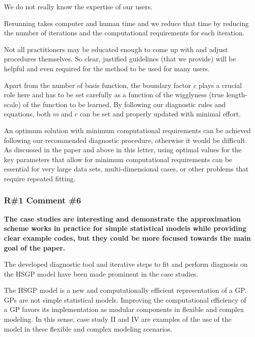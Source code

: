 \documentclass[11pt]{report}
\begin{document}
We do not really know the expertise of our users. 

Rerunning takes computer and human time and we reduce that time by reducing the number of iterations and the computational requirements for each iteration. 

Not all practitioners may be educated enough to come up with and adjust procedures themselves. So clear, justified guidelines (that we provide) will be helpful and even required for the method to be used for many users.

Apart from the number of basis function, the boundary factor $c$ plays a crucial role here and has to be set carefully as a function of the wigglyness (true length-scale) of the function to be learned. By following our diagnostic rules and equations, both $m$ and $c$ can be set and properly updated with minimal effort.

An optimum solution with minimum computational requirements can be achieved following our recommended diagnostic procedure, otherwise it would be difficult. As discussed in the paper and above in this letter, using optimal values for the key parameters that allow for minimum computational requirements can be essential for very large data sets, multi-dimensional cases, or other problems that require repeated fitting.

\subsubsection*{R\#1 Comment \#6}

\textbf{The case studies are interesting and demonstrate the approximation scheme works in practice for simple statistical models while providing clear example codes, but they could be more focused towards the main goal of the paper.}

The developed diagnostic tool and iterative steps to fit and perform diagnosis on the HSGP model have been made prominent in the case studies.

The HSGP model is a new and computationally efficient representation of a GP. GPs are not simple statistical models. Improving the computational efficiency of a GP favors its implementation as modular components in flexible and complex modeling. In this sense, case study II and IV are examples of the use of the model in these flexible and complex modeling scenarios.
\end{document}
